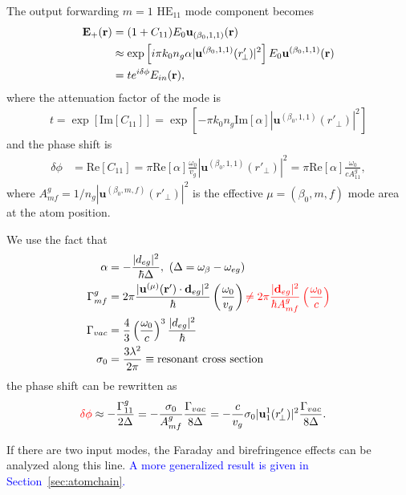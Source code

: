 \documentclass[preprint,aps,pra,onecolumn]{revtex4-1} %
\begin{document}
The output forwarding $ m=1 $ $\mathrm{HE}_{11}$ mode component becomes
\begin{align}
\mathbf{E}_+(\mathbf{r}) &= (1+C_{11})E_0\mathbf{u}_{(\beta_0,1,1)} (\mathbf{r})\\
&\approx \exp\left[i\pi k_0 n_g\alpha  | \mathbf{u}^{(\beta_0,1,1)}(r'_{\!\perp})|^2 \right] E_0\mathbf{u}^{(\beta_0,1,1)} (\mathbf{r})\\
&= {te^{i\delta\phi}} E_{in}(\mathbf{r}), 
\end{align}
where the attenuation factor of the mode is 
\begin{align}
t=\exp\left[\mathrm{Im}[C_{11}]\right]=\exp\left[ -\pi k_0 n_g \mathrm{Im}[\alpha]  | \mathbf{u}^{(\beta_0,1,1)}(r'_{\!\perp})|^2 \right]
\end{align}
and the phase shift is
\begin{align}
\delta\phi &= \mathrm{Re}[C_{11}]= \pi \mathrm{Re}[\alpha] \frac{\omega_0}{v_g}  | \mathbf{u}^{(\beta_0,1,1)}(r'_{\!\perp})|^2
= \pi \mathrm{Re}[\alpha] \frac{\omega_0}{cA^g_{11}},
\end{align}
where $ A^g_{mf}=1/n_g| \mathbf{u}^{(\beta_0,m,f)}(r'_{\!\perp})|^2 $ is the effective $\mu=(\beta_0,m,f)$ mode area at the atom position. 

We use the fact that 
\begin{align}
\alpha &=-\frac{|d_{eg}|^2}{\hbar \Delta}, \,\, (\Delta=\omega_{\beta}-\omega_{eg})\\
\Gamma^{g}_{mf} &= 2\pi \frac{|\mathbf{u}^{(\mu)}(\mathbf{r}')\cdot \mathbf{d}_{eg}|^2}{\hbar }\left(\frac{\omega_0}{v_g} \right)\mathbin{\color{red} \neq 2\pi \frac{| \mathbf{d}_{eg}|^2}{\hbar A^g_{mf}}\left(\frac{\omega_0}{c} \right)}\label{eq:Gammagmf}\\
\Gamma_{vac} &= \frac{4}{3} \left( \frac{\omega_0}{c}\right)^3 \frac{|d_{eg}|^2}{\hbar}\\
\sigma_0 &= \frac{3\lambda^2}{2\pi} \equiv \text{resonant cross section}
\end{align}
the phase shift can be rewritten as
\begin{align}
\mathbin{\color{red}{\delta\phi}} &\approx -\frac{\Gamma^{g}_{11}}{2\Delta} = - \frac{\sigma_0 }{A^g_{mf}} \frac{\Gamma_{vac}}{8\Delta} = -\frac{c}{v_g} \sigma_0 |\mathbf{u}_1^1 (r'_{\!\perp})|^2 \frac{\Gamma_{vac}}{8\Delta}.
\end{align}

If there are two input modes, the Faraday and birefringence effects can be analyzed along this line. \textcolor{blue}{A more generalized result is given in Section~\ref{sec:atomchain}.}
\end{document}
